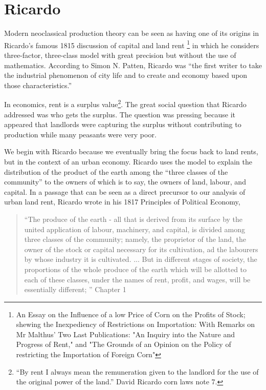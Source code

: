  \section{Ricardo}



Modern neoclassical production theory can be seen as having one of its origins in Ricardo's famous 1815 discussion of capital and  land rent \footnote{An Essay on the Influence of a low Price of Corn on the Profits of Stock; shewing the Inexpediency of Restrictions on Importation: With Remarks on Mr Malthus' Two Last Publications: "An Inquiry into the Nature and Progress of Rent," and "The Grounds of an Opinion on the Policy of restricting the Importation of Foreign Corn"} in which he considers three-factor, three-class model with great precision but without the use of mathematics.   According to Simon N. Patten, 
Ricardo was ``the first writer to take the industrial phenomenon of city life and to create and economy based upon those characteristics.'' 

In economics, rent is a surplus value\footnote{``By rent I always mean the remuneration given to the landlord for the use of the original power of the land.'' David Ricardo corn laws note 7.}. The great social question that Ricardo addressed  was who gets the surplus.  The question was pressing because it appeared that landlords were capturing the surplus without contributing to production while many peasants were very poor. 

 
We begin with Ricardo because we eventually bring the focus back to land rents, but in the context of an urban economy. Ricardo uses the model to explain the distribution of the product of the earth among the “three classes of the community”  to the owners of which is to say, the owners of land, labour, and capital. In a passage that can be seen as a direct precursor to our analysis of urban land rent, Ricardo  wrote in his 1817 Principles of Political Economy,

\begin{quotation}   
 “The produce of the earth - all that is derived from its surface by the united application of labour, machinery, and capital, is divided among three classes of the community; namely, the proprietor of the land, the owner of the stock or capital necessary for its cultivation, ad the labourers by whose industry it is cultivated. ...  But in different stages of society, the proportions of the whole produce of the earth which will be allotted to 
each of these classes, under the names of rent, profit, and wages, will be essentially different; ”  Chapter 1
\end{quotation}



